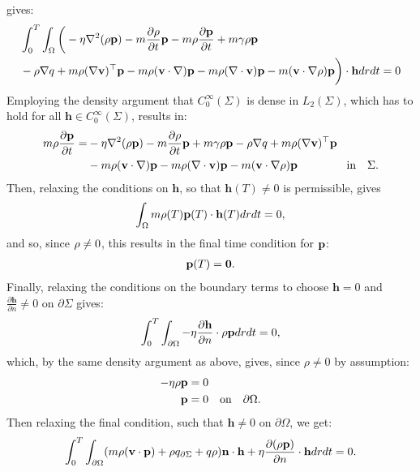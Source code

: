 gives:
\begin{align*}
&\int_0^T \int_\Omega 
\bigg( - \eta\nabla^2 (\rho \mathbf{p}) - m \frac{\partial \rho}{\partial t} \mathbf{p}  -  m\rho \frac{\partial \mathbf{p}}{\partial t} +m \gamma \rho \mathbf{p}\\
&-\rho\nabla q +m \rho (\nabla \mathbf{v})^\top\mathbf{p} 
-m \rho (\mathbf{v} \cdot \nabla)\mathbf{p} - m \rho (\nabla \cdot \mathbf{v})\mathbf{p}  - m (\mathbf{v} \cdot \nabla \rho)\mathbf{p}  \bigg)\cdot  \mathbf{h} drdt = 0
\end{align*}
Employing the density argument that $C_0^\infty(\Sigma)$ is dense in $L_2(\Sigma)$, which has to hold for all $\mathbf{h}\in C_0^\infty(\Sigma)$, results in:
\begin{align*}
  m\rho \frac{\partial \mathbf{p}}{\partial t} =& - \eta\nabla^2 (\rho \mathbf{p}) - m \frac{\partial \rho}{\partial t} \mathbf{p}   +m \gamma \rho \mathbf{p}-\rho\nabla q +m \rho (\nabla \mathbf{v})^\top\mathbf{p} \\
&-m \rho (\mathbf{v} \cdot \nabla)\mathbf{p} - m \rho (\nabla \cdot \mathbf{v})\mathbf{p}  - m (\mathbf{v} \cdot \nabla \rho)\mathbf{p}  \ \qquad\qquad \text{in} \quad \Sigma.
\end{align*}
Then, relaxing the conditions on $\mathbf{h}$, so that $\mathbf{h}(T) \neq 0 $ is permissible, gives
\begin{align*}
 \int_\Omega m \rho(T) \mathbf{p}(T) \cdot \mathbf{h}(T) dr dt=0,
\end{align*}
and so, since $\rho \neq 0$, this results in the final time condition for $\mathbf{p}$:
\begin{align}
\mathbf{p}(T)=\mathbf{0}.
\end{align}
Finally, relaxing the conditions on the boundary terms to choose $\mathbf{h}=0$ and $\frac{\partial \mathbf{h}}{\partial n} \neq 0$ on $\partial \Sigma$ gives:
\begin{align*}
\int_0^T \int_{\partial \Omega} - \eta \frac{\partial \mathbf{h}}{\partial n} \cdot \rho \mathbf{p} dr dt = 0,
\end{align*}
which, by the same density argument as above, gives, since $\rho \neq 0$ by assumption:
\begin{align}
\label{CondAdj1}
- \eta  \rho \mathbf{p} &= 0  \notag\\
 \mathbf{p} &= 0 \quad \text{on} \quad \partial \Omega.
\end{align}
Then relaxing the final condition, such that $\mathbf{h} \neq 0$ on $\partial \Omega$, we get:
\begin{align*}
\int_0^T \int_{\partial\Omega} ( m \rho (\mathbf{v} \cdot \mathbf{p})+\rho  q_{\partial \Sigma} + q \rho)  \mathbf{n}\cdot \mathbf{h}  + \eta \frac{\partial (\rho \mathbf{p})}{\partial n} \cdot \mathbf{h}dr dt=0.
\end{align*}
